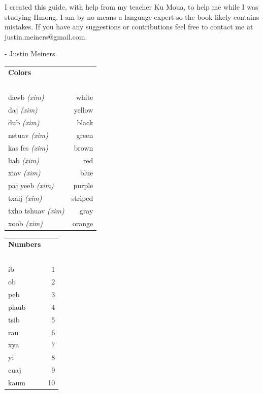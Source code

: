 \documentclass{article}
\begin{document}
I created this guide, with help from my teacher Ku Moua, to help me while I was studying Hmong.
I am by no means a language expert so the book likely contains mistakes.
If you have any suggestions or contributions feel free to contact me at justin.meiners@gmail.com.

\hfill - Justin Meiners

\clearpage

\setcounter{page}{1}

\begin{multicols}{2}
[
\section*{}
\begin{center}\rule{\textwidth}{.4pt}\end{center}
]

\begin{tabular}{l r}
\textbf{Colors} \\
~\\

dawb {\em (xim)} &white\\
daj {\em (xim)} &yellow\\
dub {\em (xim)} &black\\
nstuav {\em (xim)} &green\\
kas fes {\em (xim)} &brown\\
liab {\em (xim)} &red\\
xiav {\em (xim)} &blue\\
paj yeeb {\em (xim)} &purple\\
txaij {\em (xim)} &striped\\
txho tshuav {\em (xim)} &gray\\
xoob {\em (xim)} &orange\\
\end{tabular}

\begin{tabular}{l r}
\textbf{Numbers} \\
~\\
ib &1\\
ob &2\\
peb &3\\
plaub &4\\
tsib &5\\
rau &6\\
xya &7\\
yi &8\\
cuaj &9\\
kaum &10\\
\end{tabular}
\end{multicols}
\end{document}
